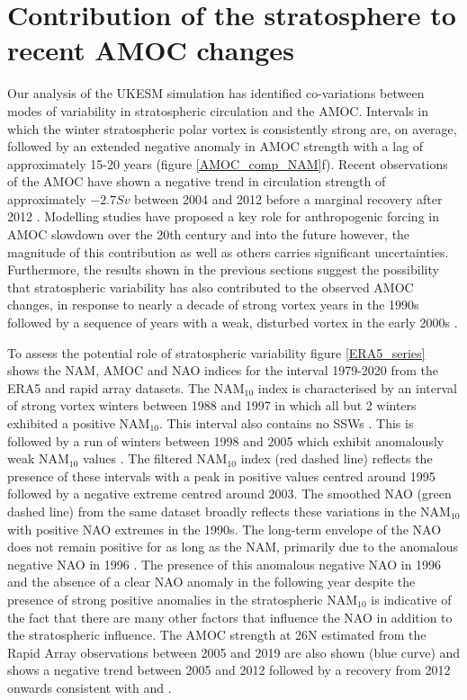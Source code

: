 \section{Contribution of the stratosphere to recent AMOC changes}
\label{sec:AMOC_obs_contribution}
Our analysis of the UKESM simulation has identified co-variations between modes of variability in stratospheric circulation and the AMOC. Intervals in which the winter stratospheric polar vortex is consistently strong are, on average, followed by an extended negative anomaly in AMOC strength with a lag of approximately 15-20 years (figure \ref{AMOC_comp_NAM}f). Recent observations of the AMOC have shown a negative trend in circulation strength of approximately $-2.7 Sv$ between 2004 and 2012 \citep{smeedNorth2018} before a marginal recovery after 2012 \citep{smeedAtlantic2019}. Modelling studies have proposed a key role for anthropogenic forcing in AMOC slowdown over the 20th century and into the future \cite{liuOverlooked2017, bakkerFate2016, liuMechanisms2019} however, the magnitude of this contribution as well as others carries significant uncertainties. Furthermore, the results shown in the previous sections suggest the possibility that stratospheric variability has also contributed to the observed AMOC changes, in response to nearly a decade of strong vortex years in the 1990s followed by a sequence of years with a weak, disturbed vortex in the early 2000s \citep{pawsonCold1999, manneyRemarkable2005}. 

To assess the potential role of stratospheric variability figure \ref{ERA5_series} shows the NAM, AMOC and NAO indices for the interval 1979-2020 from the ERA5 and rapid array datasets. The NAM$_{10}$ index is characterised by an interval of strong vortex winters between 1988 and 1997 in which all but 2 winters exhibited a positive NAM$_{10}$. This interval also contains no SSWs \citep{pawsonCold1999}. This is followed by a run of winters between 1998 and 2005 which exhibit anomalously weak NAM$_{10}$ values \cite{manneyRemarkable2005}. The filtered NAM$_{10}$ index (red dashed line) reflects the presence of these intervals with a peak in positive values centred around 1995 followed by a negative extreme centred around 2003. The smoothed NAO (green dashed line) from the same dataset broadly reflects these variations in the NAM$_{10}$ with positive NAO extremes in the 1990s. The long-term envelope of the NAO does not remain positive for as long as the NAM, primarily due to the anomalous negative NAO in 1996 \citep{halpertClimate1997}. The presence of this anomalous negative NAO in 1996 and the absence of a clear NAO anomaly in the following year despite the presence of strong positive anomalies in the stratospheric NAM$_{10}$ is indicative of the fact that there are many other factors that influence the NAO in addition to the stratospheric influence. The AMOC strength at 26N estimated from the Rapid Array observations between 2005 and 2019 are also shown (blue curve) and shows a negative trend between 2005 and 2012 followed by a recovery from 2012 onwards consistent with \cite{smeedNorth2018} and \cite{smeedAtlantic2019}. 

